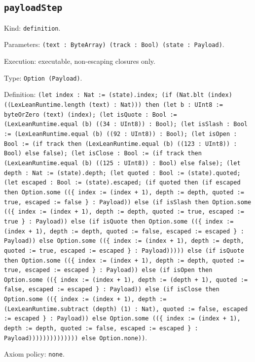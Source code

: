 \documentclass[11pt]{article}
\begin{document}
\subsection*{\texttt{payloadStep}}
\noindent Kind: \texttt{definition}.\par
\noindent Parameters: \texttt{(text : ByteArray) (track : Bool) (state : Payload)}.\par
\noindent Execution: executable, non-escaping closures only.\par
\noindent Type: \texttt{Option (Payload)}.\par
\noindent Definition: \texttt{(let index : Nat := (state).index; (if (Nat.blt (index) ((LexLeanRuntime.length (text) : Nat))) then (let b : UInt8 := byteOrZero (text) (index); (let isQuote : Bool := (LexLeanRuntime.equal (b) ((34 : UInt8)) : Bool); (let isSlash : Bool := (LexLeanRuntime.equal (b) ((92 : UInt8)) : Bool); (let isOpen : Bool := (if track then (LexLeanRuntime.equal (b) ((123 : UInt8)) : Bool) else false); (let isClose : Bool := (if track then (LexLeanRuntime.equal (b) ((125 : UInt8)) : Bool) else false); (let depth : Nat := (state).depth; (let quoted : Bool := (state).quoted; (let escaped : Bool := (state).escaped; (if quoted then (if escaped then Option.some ((\{ index := (index + 1), depth := depth, quoted := true, escaped := false \} : Payload)) else (if isSlash then Option.some ((\{ index := (index + 1), depth := depth, quoted := true, escaped := true \} : Payload)) else (if isQuote then Option.some ((\{ index := (index + 1), depth := depth, quoted := false, escaped := escaped \} : Payload)) else Option.some ((\{ index := (index + 1), depth := depth, quoted := true, escaped := escaped \} : Payload))))) else (if isQuote then Option.some ((\{ index := (index + 1), depth := depth, quoted := true, escaped := escaped \} : Payload)) else (if isOpen then Option.some ((\{ index := (index + 1), depth := (depth + 1), quoted := false, escaped := escaped \} : Payload)) else (if isClose then Option.some ((\{ index := (index + 1), depth := (LexLeanRuntime.subtract (depth) (1) : Nat), quoted := false, escaped := escaped \} : Payload)) else Option.some ((\{ index := (index + 1), depth := depth, quoted := false, escaped := escaped \} : Payload)))))))))))))) else Option.none))}.\par
\noindent Axiom policy: \texttt{none}.\par
\end{document}
